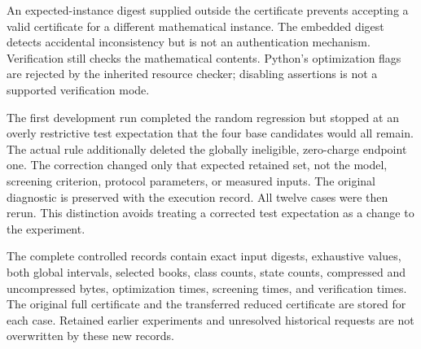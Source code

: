 An expected-instance digest supplied outside the certificate prevents accepting a valid certificate for a different mathematical instance. The embedded digest detects accidental inconsistency but is not an authentication mechanism. Verification still checks the mathematical contents. Python's optimization flags are rejected by the inherited resource checker; disabling assertions is not a supported verification mode.

The first development run completed the random regression but stopped at an overly restrictive test expectation that the four base candidates would all remain. The actual rule additionally deleted the globally ineligible, zero-charge endpoint one. The correction changed only that expected retained set, not the model, screening criterion, protocol parameters, or measured inputs. The original diagnostic is preserved with the execution record. All twelve cases were then rerun. This distinction avoids treating a corrected test expectation as a change to the experiment.

The complete controlled records contain exact input digests, exhaustive values, both global intervals, selected books, class counts, state counts, compressed and uncompressed bytes, optimization times, screening times, and verification times. The original full certificate and the transferred reduced certificate are stored for each case. Retained earlier experiments and unresolved historical requests are not overwritten by these new records.
